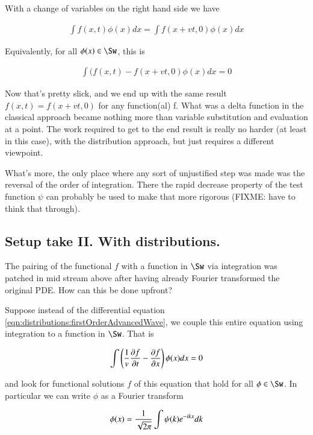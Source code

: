 With a change of variables on the right hand side we have

\begin{align*}
\int f(x,t) \phi(x) dx = \int f(x + vt,0) \phi(x) dx
\end{align*}

Equivalently, for all $\phi(x) \in \Sw$, this is

\begin{align*}
\int (f(x,t) - f(x + vt, 0) \phi(x) dx = 0
\end{align*}

Now that's pretty slick, and we end up with the same result $f(x,t) = f(x + vt, 0)$ for any function(al) f.
What was a delta function in the classical approach became nothing more than variable substitution and evaluation at a point.  The work required to get to the end result
is really no harder (at least in this case), with the distribution approach, but just requires a different viewpoint.

What's more, the only place where
any sort of unjustified step was made was the reversal of the order of integration.  There the rapid decrease property of the test function $\psi$ can probably be used
to make that more rigorous (FIXME: have to think that through).

\subsection{Setup take II.  With distributions. }

The pairing of the functional $f$ with a function in $\Sw$ via integration was patched in mid stream above after having already Fourier transformed the original PDE.
How can this be done upfront?

Suppose instead of the differential equation \ref{eqn:distributions:firstOrderAdvancedWave}, we couple this entire equation using integration to a function in $\Sw$.  That is

\begin{align*}
\int \left( \inv{v} \PD{t}{f} - \PD{x}{f} \right) \phi(x) dx = 0
\end{align*}

and look for functional solutions $f$ of this equation that hold for all $\phi \in \Sw$.  In particular we can write $\phi$ as a Fourier transform

\begin{align*}
\phi(x) = \inv{\sqrt{2\pi}} \int \psi(k) e^{-i k x} dk
\end{align*}

